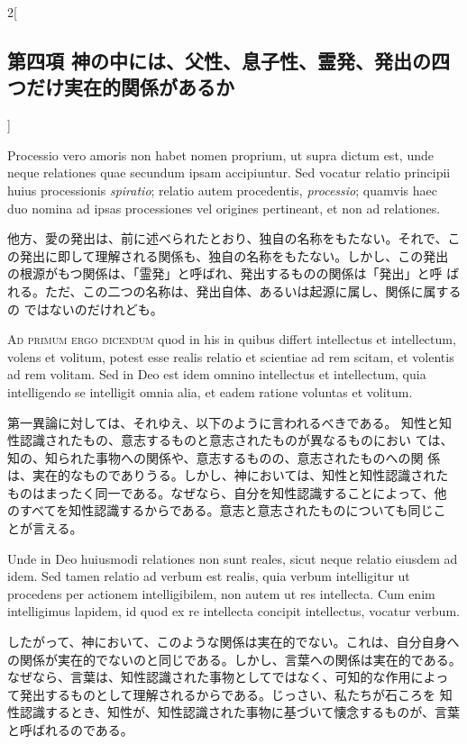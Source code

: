 \documentclass[paper=a4paper,fontsize=10pt,jafontsize=9pt,titlepage]{jlreq}
\begin{document}
\begin{paracol}{2}[\subsection{第四項 神の中には、父性、息子性、霊発、発出の四つだけ実在的関係があるか}]
\switchcolumn*


Processio vero amoris non
habet nomen proprium, ut supra dictum est, unde neque relationes quae
secundum ipsam accipiuntur. Sed vocatur relatio principii huius
processionis {\itshape spiratio}; relatio autem procedentis, {\itshape processio}; quamvis
haec duo nomina ad ipsas processiones vel origines pertineant, et non ad
relationes.


\switchcolumn


他方、愛の発出は、前に述べられたとおり、独自の名称をもたない。それで、こ
 の発出に即して理解される関係も、独自の名称をもたない。しかし、この発出
 の根源がもつ関係は、「霊発」と呼ばれ、発出するものの関係は「発出」と呼
 ばれる。ただ、この二つの名称は、発出自体、あるいは起源に属し、関係に属するの
 ではないのだけれども。


\switchcolumn*[\subsection{ad.1}]


{\scshape Ad primum ergo dicendum} quod in his in quibus differt intellectus et
intellectum, volens et volitum, potest esse realis relatio et scientiae
ad rem scitam, et volentis ad rem volitam. Sed in Deo est idem omnino
intellectus et intellectum, quia intelligendo se intelligit omnia alia,
et eadem ratione voluntas et volitum.


\switchcolumn


第一異論に対しては、それゆえ、以下のように言われるべきである。
知性と知性認識されたもの、意志するものと意志されたものが異なるものにおい
 ては、知の、知られた事物への関係や、意志するものの、意志されたものへの関
 係は、実在的なものでありうる。しかし、神においては、知性と知性認識された
 ものはまったく同一である。なぜなら、自分を知性認識することによって、他
 のすべてを知性認識するからである。意志と意志されたものについても同じこ
 とが言える。


\switchcolumn*


Unde in Deo huiusmodi relationes
non sunt reales, sicut neque relatio eiusdem ad idem. Sed tamen relatio
ad verbum est realis, quia verbum intelligitur ut procedens per actionem
intelligibilem, non autem ut res intellecta. Cum enim intelligimus
lapidem, id quod ex re intellecta concipit intellectus, vocatur verbum.


\switchcolumn


したがって、神において、このような関係は実在的でない。これは、自分自身へ
 の関係が実在的でないのと同じである。しかし、言葉への関係は実在的である。
 なぜなら、言葉は、知性認識された事物としてではなく、可知的な作用によっ
 て発出するものとして理解されるからである。じっさい、私たちが石ころを
 知性認識するとき、知性が、知性認識された事物に基づいて懐念するものが、言葉
 と呼ばれるのである。



\end{paracol}
\end{document}
